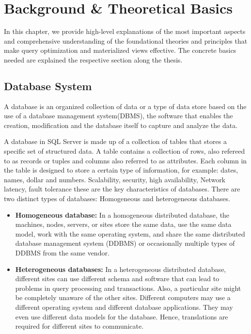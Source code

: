 \section{Background \& Theoretical Basics }

In this chapter, we provide high-level explanations of the most important aspects and comprehensive understanding of the foundational theories and principles that make query optimization and materialized views effective. The concrete basics needed are explained the respective section along the thesis.

\subsection{ Database System}

\begin{definition}
A database is an organized collection of data or a type of data store based on the use of a database management system(DBMS), the software that enables the creation, modification and the database itself to capture and analyze the data.\end{definition}\vspace{.4cm}
A database in SQL Server is made up of a collection of tables that stores a specific set of structured data. A table contains a collection of rows, also refereed to as records or tuples and columns also referred to as attributes. Each column in the table is designed to store a certain type of information, for example: dates, names, dollar and numbers.\cite{williamdassafmsft-2024} Scalability, security, high availability, Network latency, fault tolerance these are the key characteristics of databases. There are two distinct types of databases: Homogeneous and heterogeneous databases.

\begin{itemize}
    \item \textbf{Homogeneous database:} In a homogeneous distributed database, the machines, nodes, servers, or sites store the same data, use the same data model, work with the same operating system, and share the same distributed database management system (DDBMS) or occasionally multiple types of DDBMS from the same vendor.\cite{mongodb-no-date}
    \item \textbf{Heterogeneous databases:} In a heterogeneous distributed database, different sites can use different schema and software that can lead to problems in query processing and transactions. Also, a particular site might be completely unaware of the other sites. Different computers may use a different operating system and different database applications. They may even use different data models for the database. Hence, translations are required for different sites to communicate.\cite{geeksforgeeks-2023}
\end{itemize}


